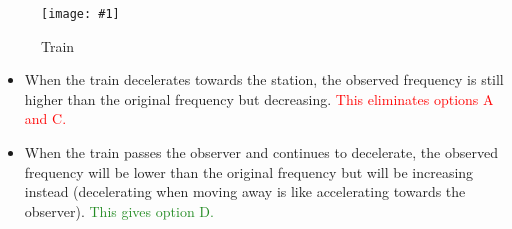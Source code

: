 \documentclass[a4paper,12pt]{article}
\newcommand{\img}[4]{\begin{center}
  \begin{figure}[H]
    \centering
    \texttt{[image: \#1]}
    \caption{#3}
    \label{fig:#4}
  \end{figure}
\end{center}}
\begin{document}
\img{ex/4.png}{0.9}{Train}{4}

\begin{itemize}
  \item When the train decelerates towards the station, the observed frequency is still higher than the original frequency but decreasing. \textcolor{red}{This eliminates options A and C.}
  \item When the train passes the observer and continues to decelerate, the observed frequency will be lower than the original frequency but will be increasing instead (decelerating when moving away is like accelerating towards the observer). \textcolor{ForestGreen}{This gives option D.}
\end{itemize}
\end{document}

